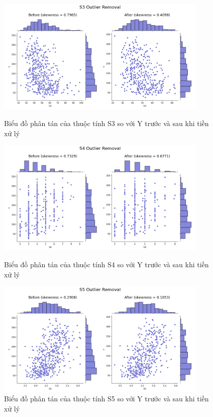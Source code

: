 \documentclass[runningheads]{llncs}
\begin{document}
\begin{figure}[H]
\centering
\includegraphics[width=0.9\textwidth]{S3OR}
\caption{Biểu đồ phân tán của thuộc tính S3 so với Y trước và sau khi tiền xử lý} \label{fig2}
\vspace{0.5cm}
\includegraphics[width=0.9\textwidth]{S4OR}
\caption{Biểu đồ phân tán của thuộc tính S4 so với Y trước và sau khi tiền xử lý} \label{fig2}
\vspace{0.5cm}
\includegraphics[width=0.9\textwidth]{S5OR}
\caption{Biểu đồ phân tán của thuộc tính S5 so với Y trước và sau khi tiền xử lý} \label{fig2}
\end{figure}
\end{document}
